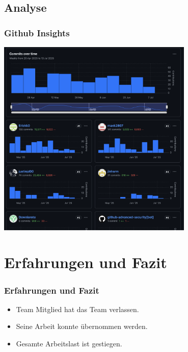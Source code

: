 \documentclass{beamer}
\begin{document}
\subsection{Analyse}
\begin{frame}
\frametitle{Github Insights}
  \center
  \includegraphics[width=0.7\textwidth]{GitCommits.png}
\end{frame}

\section{Erfahrungen und Fazit}
\begin{frame}
\frametitle{Erfahrungen und Fazit}
\begin{itemize}
  \item Team Mitglied hat das Team verlassen.
  \item Seine Arbeit konnte übernommen werden.
  \item Gesamte Arbeitslast ist gestiegen. 
\end{itemize}
\end{frame}
\end{document}
